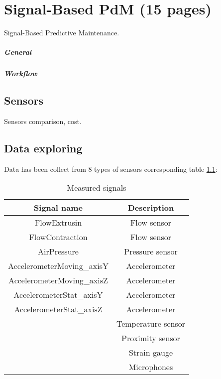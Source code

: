 %




\chapter{Signal-Based PdM (15 pages)}
Signal-Based Predictive Maintenance.
\paragraph{General}
\paragraph{Workflow}


\section{Sensors}
Sensors comparison, cost.

\section{Data exploring}
Data has been collect from 8 types of sensors corresponding table
\ref{tab:measured_signals}:
\begin{table}[h]
    \centering
    \begin{tabular}{|c|c|}
        \hline
        Signal name                   &   Description       \\     
               \hline
           FlowExtrusin               &   Flow sensor       \\
           FlowContraction            &   Flow sensor       \\
           AirPressure                &   Pressure sensor   \\
           AccelerometerMoving\_axisY &   Accelerometer     \\
           AccelerometerMoving\_axisZ &   Accelerometer     \\
           AccelerometerStat\_axisY   &   Accelerometer     \\
           AccelerometerStat\_axisZ   &   Accelerometer     \\
                                      &   Temperature sensor\\
                                      &   Proximity sensor  \\
                                      &   Strain gauge      \\ 
                                      &   Microphones       \\ 
        \hline
    \end{tabular}
    \caption{Measured signals}
    \label{tab:measured_signals}
\end{table}

